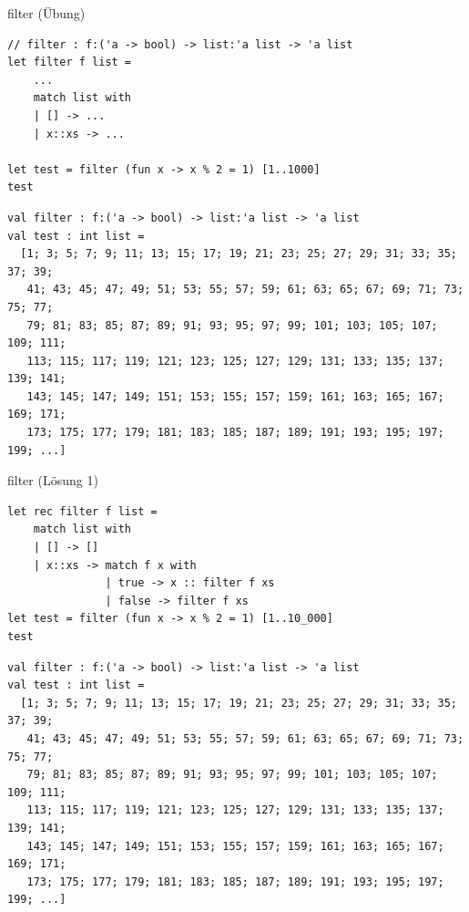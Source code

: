 \documentclass[t]{beamer}
\begin{document}
\begin{frame}[label={sec:org22cceea},fragile]{filter (Übung)}
 \begin{verbatim}
// filter : f:('a -> bool) -> list:'a list -> 'a list
let filter f list =
    ...
    match list with
    | [] -> ...
    | x::xs -> ...

let test = filter (fun x -> x % 2 = 1) [1..1000]
test
\end{verbatim}

\begin{verbatim}
val filter : f:('a -> bool) -> list:'a list -> 'a list
val test : int list =
  [1; 3; 5; 7; 9; 11; 13; 15; 17; 19; 21; 23; 25; 27; 29; 31; 33; 35; 37; 39;
   41; 43; 45; 47; 49; 51; 53; 55; 57; 59; 61; 63; 65; 67; 69; 71; 73; 75; 77;
   79; 81; 83; 85; 87; 89; 91; 93; 95; 97; 99; 101; 103; 105; 107; 109; 111;
   113; 115; 117; 119; 121; 123; 125; 127; 129; 131; 133; 135; 137; 139; 141;
   143; 145; 147; 149; 151; 153; 155; 157; 159; 161; 163; 165; 167; 169; 171;
   173; 175; 177; 179; 181; 183; 185; 187; 189; 191; 193; 195; 197; 199; ...]
\end{verbatim}
\end{frame}

\begin{frame}[label={sec:orga51724e},fragile]{filter (Lösung 1)}
 \begin{verbatim}
let rec filter f list = 
    match list with
    | [] -> []
    | x::xs -> match f x with
               | true -> x :: filter f xs
               | false -> filter f xs
let test = filter (fun x -> x % 2 = 1) [1..10_000]
test
\end{verbatim}

\begin{verbatim}
val filter : f:('a -> bool) -> list:'a list -> 'a list
val test : int list =
  [1; 3; 5; 7; 9; 11; 13; 15; 17; 19; 21; 23; 25; 27; 29; 31; 33; 35; 37; 39;
   41; 43; 45; 47; 49; 51; 53; 55; 57; 59; 61; 63; 65; 67; 69; 71; 73; 75; 77;
   79; 81; 83; 85; 87; 89; 91; 93; 95; 97; 99; 101; 103; 105; 107; 109; 111;
   113; 115; 117; 119; 121; 123; 125; 127; 129; 131; 133; 135; 137; 139; 141;
   143; 145; 147; 149; 151; 153; 155; 157; 159; 161; 163; 165; 167; 169; 171;
   173; 175; 177; 179; 181; 183; 185; 187; 189; 191; 193; 195; 197; 199; ...]
\end{verbatim}
\end{frame}
\end{document}
